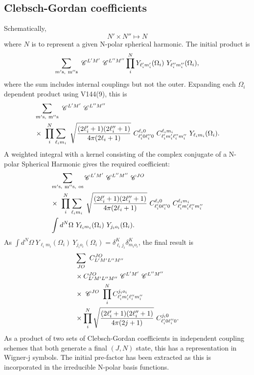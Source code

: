 \documentclass[useAMS,usenatbib]{mn2e}
\newcommand{\cg}[6]{
C^{#1 #2}_{#3 #4 #5 #6}
}
\begin{document}
\subsection{Clebsch-Gordan coefficients}
Schematically,
\begin{equation}
    N' \times N'' \mapsto N
\end{equation}
where $N$ is to represent a given N-polar spherical harmonic.  The initial product is
\begin{equation}
    \sum _{m' \rm{s}, \ m'' \rm{s}} \ \mathcal{C}^{L' M'} \ \mathcal{C}^{L'' M''} \prod_i^{N} Y_{\ell_i ' m_i'} (\Omega_i) \ Y_{\ell_i '' m_i''}(\Omega_i),
\end{equation}
where the sum includes internal couplings but not the outer.  Expanding each $\Omega_i$ dependent product using V144(9), this is
\begin{align}
    &\sum _{m' \rm{s}, \ m'' \rm{s}} \ \mathcal{C}^{L' M'} \ \mathcal{C}^{L'' M''} \notag \\ 
    & \times \ \prod_i^{N} \sum_{\ell_i m_i}
    \ \sqrt{\frac{(2 \ell_i' + 1)(2 \ell_i '' +1)}{4 \pi (2 \ell_i + 1)}} 
    \ \cg{\ell_i}{0}{\ell_i'}{0}{\ell_i''}{0}
    \ \cg{\ell_i}{m_i}{\ell_i'}{m_i'}{\ell_i''}{m_i''} 
    \ Y_{\ell_i m_i}(\Omega_i).
\end{align}
A weighted integral with a kernel consisting of the complex conjugate of a N-polar Spherical Harmonic gives the required coefficient:
\begin{align}
&\sum_{m' \rm{s}, \ m'' \rm{s}, \ o \rm{s}}    
\mathcal{C}^{L' M'} \ 
\mathcal{C}^{L'' M''} \ 
\mathcal{C}^{J O} \ 
\notag \\ 
& \times \ \prod_i^{N} \sum_{\ell_i m_i}
    \ \sqrt{\frac{(2 \ell_i' + 1)(2 \ell_i '' +1)}{4 \pi (2 \ell_i + 1)}} 
    \ \cg{\ell_i}{0}{\ell_i'}{0}{\ell_i''}{0}
    \ \cg{\ell_i}{m_i}{\ell_i'}{m_i'}{\ell_i''}{m_i''} \notag \\
    & \int d^N \Omega \ Y_{\ell_i m_i}(\Omega_i) \ Y_{j_i o_i}(\Omega_i).
\end{align}
As $\int d^N \Omega \ Y_{\ell_i m_i}(\Omega_i) \ Y_{j_i o_i}(\Omega_i) = \delta^{K}_{\ell_i j_i} \delta^{K}_{m_i o_i}$, the final result is 
\begin{align}
    & \sum_{JO} 
    \ C^{JO}_{L' M' L'' M''} \notag \\ 
    & \times 
    C^{JO}_{L' M' L'' M''}
    \ \mathcal{C}^{L' M'}
    \ \mathcal{C}^{L'' M''}
    \notag \\ 
    & \times \ \mathcal{C}^{JO} \ \prod_i^{N} \cg{j_i}{o_i}{\ell_i'}{m_i'}{\ell_i''}{m_i''}
    \notag \\ 
    & \times \prod_i^{N} \sqrt{\frac{(2 \ell_i' + 1)(2 \ell_i '' +1)}{4 \pi (2 j + 1)}} \ \cg{j_i}{0}{\ell_i'}{0}{\ell_i''}{0}.
\end{align}
As a product of two sets of Clebsch-Gordan coefficients in independent coupling schemes that both generate a final $(J,N)$ state, this has a representation in Wigner-j symbols.  The initial pre-factor has been extracted as this is incorporated in the irreducible N-polar basis functions. 
\end{document}
